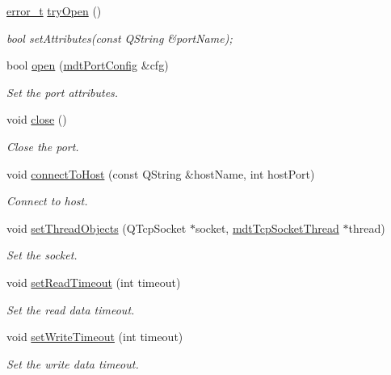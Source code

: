 \begin{DoxyCompactItemize}
\item 
\hyperlink{classmdt_abstract_port_ad4121bb930c95887e77f8bafa065a85e}{error\_\-t} \hyperlink{classmdt_tcp_socket_af151666d97ee2547297ff836430893ce}{tryOpen} ()
\begin{DoxyCompactList}\small\item\em bool setAttributes(const QString \&portName); \end{DoxyCompactList}\item 
bool \hyperlink{classmdt_tcp_socket_aca164cd2f0b47988291afb7fbb423648}{open} (\hyperlink{classmdt_port_config}{mdtPortConfig} \&cfg)
\begin{DoxyCompactList}\small\item\em Set the port attributes. \end{DoxyCompactList}\item 
void \hyperlink{classmdt_tcp_socket_a7fd4aec4bc5e3e17034f0ec6647af1e8}{close} ()
\begin{DoxyCompactList}\small\item\em Close the port. \end{DoxyCompactList}\item 
void \hyperlink{classmdt_tcp_socket_aa5b229a668c0d9b083f8eec8efe4636f}{connectToHost} (const QString \&hostName, int hostPort)
\begin{DoxyCompactList}\small\item\em Connect to host. \end{DoxyCompactList}\item 
void \hyperlink{classmdt_tcp_socket_a8a57e4b49f56c301c5f8d7a9ec191e87}{setThreadObjects} (QTcpSocket $\ast$socket, \hyperlink{classmdt_tcp_socket_thread}{mdtTcpSocketThread} $\ast$thread)
\begin{DoxyCompactList}\small\item\em Set the socket. \end{DoxyCompactList}\item 
void \hyperlink{classmdt_tcp_socket_aae23057f2e0ee326d0fee78ffe3f00f9}{setReadTimeout} (int timeout)
\begin{DoxyCompactList}\small\item\em Set the read data timeout. \end{DoxyCompactList}\item 
void \hyperlink{classmdt_tcp_socket_ac59d2dfdf405b5382f0f20d5b9f75fd0}{setWriteTimeout} (int timeout)
\begin{DoxyCompactList}\small\item\em Set the write data timeout. \end{DoxyCompactList}\item 

\end{DoxyCompactItemize}
